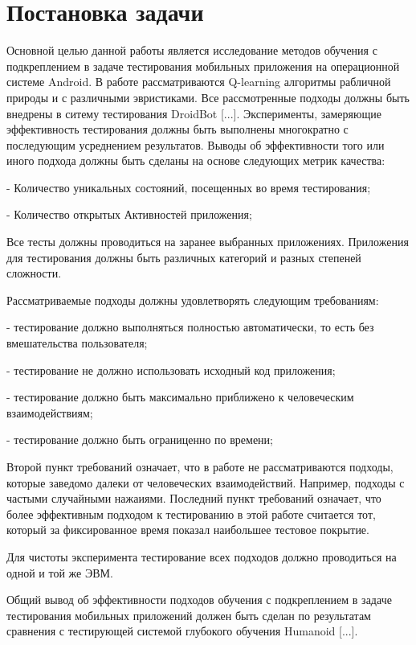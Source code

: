 \section{Постановка задачи}
\label{sec:Chapter1} 

Основной целью данной работы является исследование методов обучения с подкреплением в задаче тестирования мобильных приложения на операционной системе Android. В работе рассматриваются Q-learning алгоритмы рабличной природы и с различными эвристиками. Все рассмотренные подходы должны быть внедрены в ситему тестирования DroidBot [...]. Эксперименты, замеряющие эффективность тестирования должны быть выполнены многократно с последующим усреднением результатов. Выводы об эффективности того или иного подхода должны быть сделаны на основе следующих метрик качества:

- Количество уникальных состояний, посещенных во время тестирования;

- Количество открытых Активностей приложения;

Все тесты должны проводиться на заранее выбранных приложениях. Приложения для тестирования должны быть различных категорий и разных степеней сложности.

Рассматриваемые подходы должны удовлетворять следующим требованиям:

- тестирование должно выполняться полностью автоматически, то есть без вмешательства пользователя;

- тестирование не должно использовать исходный код приложения;

- тестирование должно быть максимально приближено к человеческим взаимодействиям;

- тестирование должно быть ограниценно по времени;


Второй пункт требований означает, что в работе не рассматриваются подходы, которые заведомо далеки от человеческих взаимодействий. Например, подходы с частыми случайными нажаиями. Последний пункт требований означает, что более эффективным подходом к тестированию в этой работе считается тот, который за фиксированное время показал наибольшее тестовое покрытие.

Для чистоты эксперимента тестирование всех подходов должно проводиться на одной и той же ЭВМ.

Общий вывод об эффективности подходов обучения с подкреплением в задаче тестирования мобильных приложений должен быть сделан по результатам сравнения с тестирующей системой глубокого обучения Humanoid [...].

